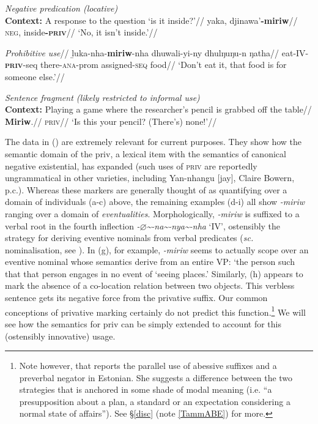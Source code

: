 \a\begingl\glpreamble\textit{Negative predication (locative)}\\ \textbf{Context:} A response to the question `is it inside?'//
\gla yaka, djinawa'\textbf{-miriw}//
\glb \textsc{neg}, inside\textsc{\textbf{-priv}}//
\glft`No, it isn't inside.'//\endgl

\a\begingl\glpreamble\textit{ Prohibitive use}//
\gla ḻuka-nha-\textbf{miriw}-nha dhuwali-yi-ny dhulŋuŋu-n ŋatha//
\glb eat-IV-\textsc{\textbf{priv}}-\gls{seq} there-\textsc{ana}-\gls{prom} assigned-\textsc{seq} food//
\glft`Don't eat it, that food is for someone else.'//\endgl

\a\begingl\glpreamble\textit{Sentence fragment (likely restricted to informal use)}\\ \textbf{Context:} Playing a game where the researcher's pencil is grabbed off the table//
\gla {} \textbf{Miriw}.//
\glb \textsc{priv}//
\glft `Is this your pencil? (There's) none!'\trailingcitation{[AW~20180731]}//\endgl


\xe


The data in (\lastx) are extremely relevant for current purposes. They show how the semantic domain of the \gls{priv}, a lexical item with the semantics of canonical negative existential, has expanded (such uses of \textsc{priv} are reportedly ungrammatical in other varieties, including Yan-nhangu [\gls{jay}], Claire Bowern, p.c.). Whereas these markers are generally thought of as quantifying over a domain of individuals (a-c) above, the remaining examples (d-i) all show \textit{-miriw} ranging over a domain of \textit{eventualities}. Morphologically, \mbox{\textit{-miriw}} is suffixed to a verbal root in the fourth inflection \textit{-$\varnothing$\textasciitilde-na\textasciitilde-nya\textasciitilde-nha} `IV', ostensibly the strategy for deriving eventive nominals from verbal predicates (\textit{sc.} nominalisation, see \citealt[103]{Lowe1996}). In (g), for example, \textit{-miriw} seems to actually scope over an eventive nominal whose semantics derive from an entire VP: `the person such that that person engages in no event of `seeing places.' Similarly, (h) appears to mark the absence of a co-location relation between two objects. This verbless sentence gets its negative force from the privative suffix. Our common conceptions of privative marking certainly do not predict this function.\footnote{Note however, that \citet{Tamm2009,Tamm2015} reports the parallel use of abessive suffixes and a preverbal negator in Estonian. She suggests a difference between the two strategies that is anchored in some shade of modal meaning (i.e. ``a presupposition about a plan, a standard or an expectation considering a normal state of affairs''). See §\ref{disc} (note \ref{TammABE}) for more.} We will see how the semantics for \gls{priv} can be simply extended to account for this (ostensibly innovative) usage.

